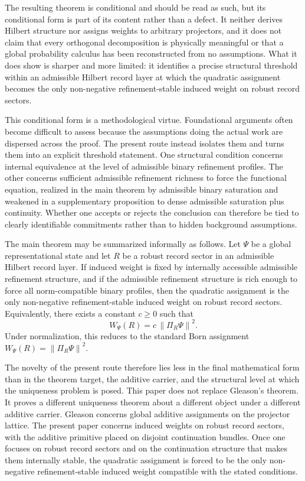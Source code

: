 \documentclass[11pt]{article}
\theoremstyle{remark}
\numberwithin{equation}{section}
\newcommand{\Wpsi}[1]{W_{\Psi}\!\left(#1\right)}
\newcommand{\Proj}[1]{\Pi_{#1}}
\newcommand{\norm}[1]{\left\lVert #1 \right\rVert}
\begin{document}
The resulting theorem is conditional and should be read as such, but its conditional form is part of its content rather than a defect. It neither derives Hilbert structure nor assigns weights to arbitrary projectors, and it does not claim that every orthogonal decomposition is physically meaningful or that a global probability calculus has been reconstructed from no assumptions. What it does show is sharper and more limited: it identifies a precise structural threshold within an admissible Hilbert record layer at which the quadratic assignment becomes the only non-negative refinement-stable induced weight on robust record sectors.

This conditional form is a methodological virtue. Foundational arguments often become difficult to assess because the assumptions doing the actual work are dispersed across the proof. The present route instead isolates them and turns them into an explicit threshold statement. One structural condition concerns internal equivalence at the level of admissible binary refinement profiles. The other concerns sufficient admissible refinement richness to force the functional equation, realized in the main theorem by admissible binary saturation and weakened in a supplementary proposition to dense admissible saturation plus continuity. Whether one accepts or rejects the conclusion can therefore be tied to clearly identifiable commitments rather than to hidden background assumptions.

The main theorem may be summarized informally as follows. Let $\Psi$
be a global representational state and let $R$ be a robust record
sector in an admissible Hilbert record layer. If induced weight is
fixed by internally accessible admissible refinement structure, and if
the admissible refinement structure is rich enough to force all
norm-compatible binary profiles, then the quadratic assignment is the
only non-negative refinement-stable induced weight on robust record
sectors. Equivalently, there exists a constant $c \geq 0$ such that
\[
\Wpsi{R} = c\,\norm{\Proj{R}\Psi}^2.
\]
Under normalization, this reduces to the standard Born assignment
$\Wpsi{R} = \norm{\Proj{R}\Psi}^2$.

The novelty of the present route therefore lies less in the final mathematical form than in the theorem target, the additive carrier, and the structural level at which the uniqueness problem is posed. This paper does not replace Gleason's theorem. It proves a different uniqueness theorem about a different object under a different additive carrier. Gleason concerns global additive assignments on the projector lattice. The present paper concerns induced weights on robust record sectors, with the additive primitive placed on disjoint continuation bundles. Once one focuses on robust record sectors and on the continuation structure that makes them internally stable, the quadratic assignment is forced to be the only non-negative refinement-stable induced weight compatible with the stated conditions.
\end{document}
